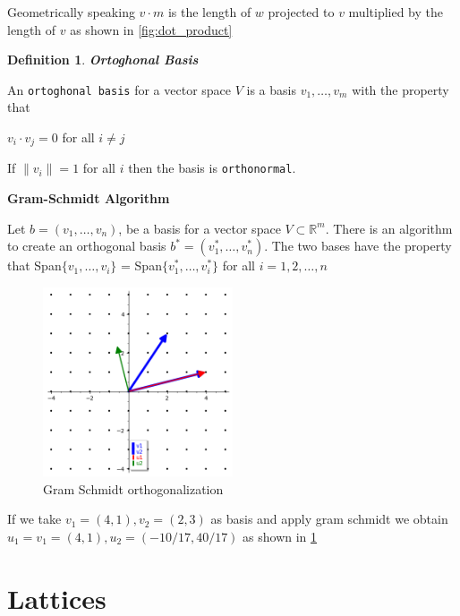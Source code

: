 \documentclass[a4paper,12pt]{report}
\newtheorem{definition}{Definition}[section]
\newcommand{\R}{\mathbb{R}}
\newcommand{\dd}{\cdot}
\begin{document}
Geometrically speaking $v \cdot m$ is the length of $w$ projected to $v$ multiplied by the length of $v$ as shown in \ref{fig:dot_product}

\begin{definition}
    \textbf{Ortoghonal Basis} 
\end{definition}

An \texttt{ortoghonal basis} for a vector space $V$ is a basis $v_1, \ldots, v_m$ with the property that

\begin{center}
    $v_i \dd v_j = 0$ for all $i \neq j$
\end{center}

If $\lVert v_i \rVert = 1$ for all $i$ then the basis is \texttt{orthonormal}.

\begin{algorithm}
    \textbf{Gram-Schmidt Algorithm}
\end{algorithm}

Let $b = (v_1, \ldots, v_n)$, be a basis for a vector space $V \subset \R^m$. There is an algorithm to create an orthogonal basis
$b^* = (v_1^*,\ldots,v_n^*)$.
The two bases have the property that Span$\{v_1,\ldots,v_i\}$ = Span$\{v_1^*,\ldots,v_i^*\}$ for all $i = 1,2,\ldots,n$

\begin{figure}[htpb]
    \centering
    \includegraphics[width=0.5\textwidth]{./img/gram_schmidt.png}
    \caption{Gram Schmidt orthogonalization}
    \label{fig:gram_schmidt}
\end{figure}

If we take $v_1=(4, 1), v_2=(2, 3)$ as basis and apply gram schmidt we obtain $u_1=v_1=(4, 1), u_2=(-10/17, 40/17)$ as shown in \ref{fig:gram_schmidt}

\section{Lattices}
\end{document}
